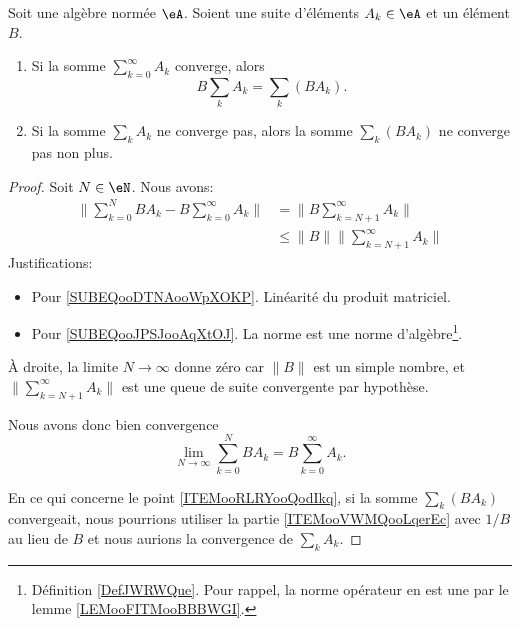 \begin{proposition}      \label{PROPooMZZQooEhQsgQ}
	Soit une algèbre normée \( \eA\). Soient une suite d'éléments \( A_k\in \eA\) et un élément \( B\).
	\begin{enumerate}
		\item		\label{ITEMooVWMQooLqerEc}
		      Si la somme \( \sum_{k=0}^{\infty}A_k\) converge, alors
		      \begin{equation}		\label{EQooPOFWooGNWIUF}
			      B\sum_kA_k=\sum_k(BA_k).
		      \end{equation}
		\item		\label{ITEMooRLRYooQodIkq}
		      Si la somme \( \sum_kA_k\) ne converge pas, alors la somme \( \sum_k(BA_k)\) ne converge pas non plus.
	\end{enumerate}
\end{proposition}

\begin{proof}
	Soit \( N\in \eN\). Nous avons:
	\begin{subequations}
		\begin{align}
			\| \sum_{k=0}^NBA_k-B\sum_{k=0}^{\infty}A_k \| & =\| B\sum_{k=N+1}^{\infty}A_k \|            \label{SUBEQooDTNAooWpXOKP} \\
			                                               & \leq \| B \|\| \sum_{k=N+1}^{\infty}A_k \|  \label{SUBEQooJPSJooAqXtOJ}
		\end{align}
	\end{subequations}
	Justifications:
	\begin{itemize}
		\item Pour \eqref{SUBEQooDTNAooWpXOKP}. Linéarité du produit matriciel.
		\item Pour \eqref{SUBEQooJPSJooAqXtOJ}. La norme est une norme d'algèbre\footnote{Définition \ref{DefJWRWQue}. Pour rappel, la norme opérateur en est une par le lemme \ref{LEMooFITMooBBBWGI}.}.
	\end{itemize}
	À droite, la limite \( N\to \infty\) donne zéro car \( \| B \|\) est un simple nombre, et \( \| \sum_{k=N+1}^{\infty}A_k \|\) est une queue de suite convergente par hypothèse.

	Nous avons donc bien convergence
	\begin{equation}
		\lim_{N\to \infty}\sum_{k=0}^{N}BA_k=B\sum_{k=0}^{\infty}A_k.
	\end{equation}

	En ce qui concerne le point \ref{ITEMooRLRYooQodIkq}, si la somme \( \sum_k(BA_k)\) convergeait, nous pourrions utiliser la partie \ref{ITEMooVWMQooLqerEc} avec \( 1/B\) au lieu de \( B\) et nous aurions la convergence de \( \sum_kA_k\).
\end{proof}


